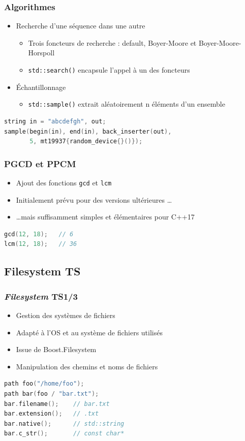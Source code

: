 \documentclass[C++.tex]{subfiles}
\begin{document}
\begin{frame}[fragile]
	\frametitle{Algorithmes}
	\begin{itemize}
		\item Recherche d'une séquence dans une autre
		\begin{itemize}
			\item Trois foncteurs de recherche : default, Boyer-Moore et Boyer-Moore-Horspoll
			\item \lstinline|std::search()| encapsule l'appel à un des foncteurs
		\end{itemize}
		\item Échantillonnage
		\begin{itemize}
			\item \lstinline|std::sample()| extrait aléatoirement n éléments d'un ensemble
		\end{itemize}
	\end{itemize}

	\begin{lstlisting}[language=C++]
string in = "abcdefgh", out;
sample(begin(in), end(in), back_inserter(out), 
       5, mt19937{random_device{}()});\end{lstlisting}
\end{frame}

\begin{frame}[fragile]
	\frametitle{PGCD et PPCM}
	\begin{itemize}
		\item Ajout des fonctions \lstinline|gcd| et \lstinline|lcm|
		\item Initialement prévu pour des versions ultérieures \ldots
		\item \ldots mais suffisamment simples et élémentaires pour C++17 
	\end{itemize}

	\begin{lstlisting}[language=C++]
gcd(12, 18);   // 6
lcm(12, 18);   // 36\end{lstlisting}
\end{frame}

\subsection*{Filesystem TS}
\begin{frame}[fragile]
	\frametitle{\textit{Filesystem} TS\titlehfill{}1/3}
	\begin{itemize}
		\item Gestion des systèmes de fichiers
		\item Adapté à l'OS et au système de fichiers utilisés
		\item Issue de Boost.Filesystem
		\item Manipulation des chemins et noms de fichiers
	\end{itemize}

	\begin{lstlisting}[language=C++]
path foo("/home/foo");
path bar(foo / "bar.txt");
bar.filename();    // bar.txt
bar.extension();   // .txt
bar.native();      // std::string
bar.c_str();       // const char*\end{lstlisting}
\end{frame}
\end{document}
